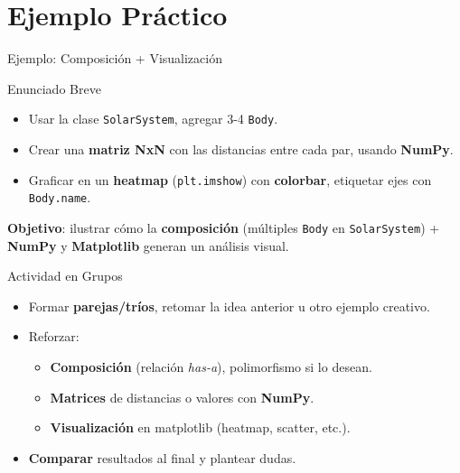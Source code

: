 \documentclass[10pt]{beamer}
\begin{document}
\section{Ejemplo Práctico}

\begin{frame}{Ejemplo: Composición + Visualización}
  \begin{block}{Enunciado Breve}
    \begin{itemize}
      \item Usar la clase \texttt{SolarSystem}, agregar 3-4 \texttt{Body}.
      \item Crear una \textbf{matriz NxN} con las distancias entre cada par, usando \textbf{NumPy}.
      \item Graficar en un \textbf{heatmap} (\texttt{plt.imshow}) con \textbf{colorbar}, etiquetar ejes con \texttt{Body.name}.
    \end{itemize}
  \end{block}
  \textbf{Objetivo}: ilustrar cómo la \textbf{composición} (múltiples \texttt{Body} en \texttt{SolarSystem}) + \textbf{NumPy} y \textbf{Matplotlib} generan un análisis visual.
\end{frame}

\begin{frame}{Actividad en Grupos}
  \begin{itemize}
    \item Formar \textbf{parejas/tríos}, retomar la idea anterior u otro ejemplo creativo.
    \item Reforzar:
      \begin{itemize}
        \item \textbf{Composición} (relación \emph{has-a}), polimorfismo si lo desean.
        \item \textbf{Matrices} de distancias o valores con \textbf{NumPy}.
        \item \textbf{Visualización} en matplotlib (heatmap, scatter, etc.).
      \end{itemize}
    \item \textbf{Comparar} resultados al final y plantear dudas.
  \end{itemize}
\end{frame}
\end{document}
